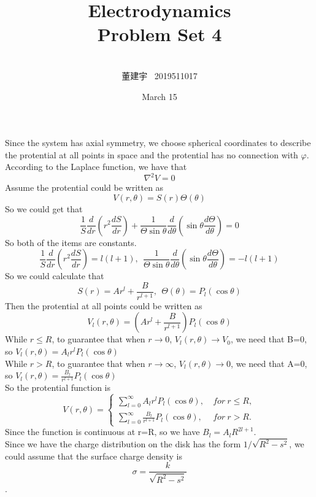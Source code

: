 \documentclass[10.5pt]{article}
\title{Electrodynamics \\Problem Set 4\\}
\author{\\董建宇 ~2019511017}
\date{March 15}
\begin{document}
    
\maketitle
\newpage

\section{}
\subsection{}
Since the system has axial symmetry, we choose spherical coordinates to describe the protential at all points in space and the protential has no connection with $\varphi$.\\\indent
According to the Laplace function, we have that$$\nabla^2V = 0$$\indent
Assume the protential could be written as$$V(r,\theta) = S(r) \Theta (\theta)$$\indent
So we could get that$$\frac{1}{S}\frac{d}{dr}\left(r^2\frac{dS}{dr}\right) + \frac{1}{\Theta \sin\theta}\frac{d}{d\theta}\left(\sin\theta \frac{d\Theta}{d\theta}\right) = 0$$\indent
So both of the items are constants.$$\frac{1}{S}\frac{d}{dr}\left(r^2\frac{dS}{dr}\right) = l(l+1),~~\frac{1}{\Theta \sin\theta}\frac{d}{d\theta}\left(\sin\theta \frac{d\Theta}{d\theta}\right) = -l(l+1)$$\indent
So we could calculate that$$S(r) = Ar^l+\frac{B}{r^{l+1}},~~\Theta(\theta) = P_l(\cos\theta)$$\indent
Then the protential at all points could be written as $$V_l(r,\theta) = \left(Ar^l+\frac{B}{r^{l+1}}\right)P_l(\cos\theta)$$\indent
While $r\leqslant R$, to guarantee that when $r \to 0$, $V_l(r,\theta) \to V_0$, we need that B=0, so $V_l(r,\theta) = A_lr^lP_l(\cos\theta)$\\\indent
While $r > R$, to guarantee that when $r\to \infty$, $V_l(r,\theta) \to 0$, we need that A=0, so $V_l(r,\theta) = \frac{B_l}{r^{l+1}}P_l(\cos\theta)$\\\indent
So the protential function is $$V(r,\theta) = \begin{cases}
    \sum_{l=0}^{\infty} A_l r^l P_l(\cos\theta), & ~for ~r\leqslant R,\\
    \sum_{l=0}^{\infty} \frac{B_l}{r^{l+1}} P_l(\cos\theta), & ~for ~r>R.
\end{cases}$$\indent
Since the function is continuous at r=R, so we have $B_l = A_l R^{2l+1}$. \\\indent
Since we have the charge distribution on the disk has the form $1/\sqrt{R^2-s^2}$, we could assume that the surface charge density is $$\sigma = \frac{k}{\sqrt{R^2-s^2}}$$.\indent
\end{document}

